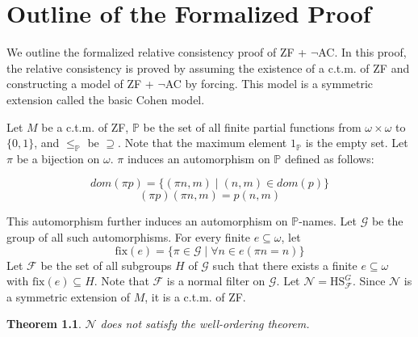 \documentclass{report}
\newtheorem{thm}{Theorem}[chapter]
\newcommand{\Pbb}{\mathbb{P}}
\newcommand{\Gcal}{\mathcal{G}}
\newcommand{\Fcal}{\mathcal{F}}
\newcommand{\Ncal}{\mathcal{N}}
\begin{document}
\chapter{Outline of the Formalized Proof}
We outline the formalized relative consistency proof of ZF + $\neg$AC. 
In this proof, the relative consistency is proved by assuming the existence of a c.t.m. of ZF and constructing a model of ZF + $\neg$AC by forcing. 
This model is a symmetric extension called the basic Cohen model.

Let $M$ be a c.t.m. of ZF, $\Pbb$ be the set of all finite partial functions from $\omega \times \omega$ to $\{0, 1\}$, and $\leq_{\Pbb}$ be $\supseteq$.
Note that the maximum element $1_{\Pbb}$ is the empty set. 
Let $\pi$ be a bijection on $\omega$. $\pi$ induces an automorphism on $\Pbb$ defined as follows:

$$dom(\pi p) = \{ (\pi n, m) \mid (n, m) \in dom(p) \}$$
$$(\pi p)(\pi n, m) = p(n, m)$$

This automorphism further induces an automorphism on $\Pbb$-names. 
Let $\Gcal$ be the group of all such automorphisms.
For every finite $e \subseteq \omega$, let 
$$\text{fix}(e) = \{ \pi \in \Gcal \mid \forall n \in e (\pi n = n) \}$$
Let $\Fcal$ be the set of all subgroups $H$ of $\Gcal$ such that there exists a finite $e \subseteq \omega$ with $\text{fix}(e) \subseteq H$.
Note that $\Fcal$ is a normal filter on $\Gcal$. Let $\Ncal = \text{HS}^{G}_{\Fcal}$.
Since $\Ncal$ is a symmetric extension of $M$, it is a c.t.m. of ZF. 

\begin{thm}
  $\Ncal$ does not satisfy the well-ordering theorem.
\end{thm}
\end{document}
